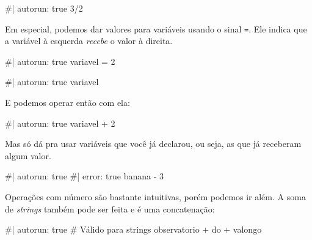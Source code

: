 \documentclass[
  letterpaper,
  DIV=11,
  numbers=noendperiod]{scrreprt}
\newenvironment{Shaded}{\begin{snugshade}}{\end{snugshade}}
\newcommand{\NormalTok}[1]{\textcolor[rgb]{0.00,0.23,0.31}{#1}}
\begin{document}
\begin{Shaded}
\begin{Highlighting}[]
\NormalTok{\#| autorun: true}
\NormalTok{3/2}
\end{Highlighting}
\end{Shaded}

Em especial, podemos dar valores para variáveis usando o sinal
\texttt{=}. Ele indica que a variável à esquerda \emph{recebe} o valor à
direita.

\begin{Shaded}
\begin{Highlighting}[]
\NormalTok{\#| autorun: true}
\NormalTok{variavel = 2}
\end{Highlighting}
\end{Shaded}

\begin{Shaded}
\begin{Highlighting}[]
\NormalTok{\#| autorun: true}
\NormalTok{variavel}
\end{Highlighting}
\end{Shaded}

E podemos operar então com ela:

\begin{Shaded}
\begin{Highlighting}[]
\NormalTok{\#| autorun: true}
\NormalTok{variavel + 2 }
\end{Highlighting}
\end{Shaded}

Mas só dá pra usar variáveis que você já declarou, ou seja, as que já
receberam algum valor.

\begin{Shaded}
\begin{Highlighting}[]
\NormalTok{\#| autorun: true}
\NormalTok{\#| error: true}
\NormalTok{banana {-} 3 }
\end{Highlighting}
\end{Shaded}

Operações com número são bastante intuitivas, porém podemos ir além. A
soma de \emph{strings} também pode ser feita e é uma concatenação:

\begin{Shaded}
\begin{Highlighting}[]
\NormalTok{\#| autorun: true}
\NormalTok{\# Válido para strings}
\NormalTok{\textquotesingle{}observatorio\textquotesingle{} + \textquotesingle{} do \textquotesingle{} + \textquotesingle{}valongo\textquotesingle{}}
\end{Highlighting}
\end{Shaded}
\end{document}

